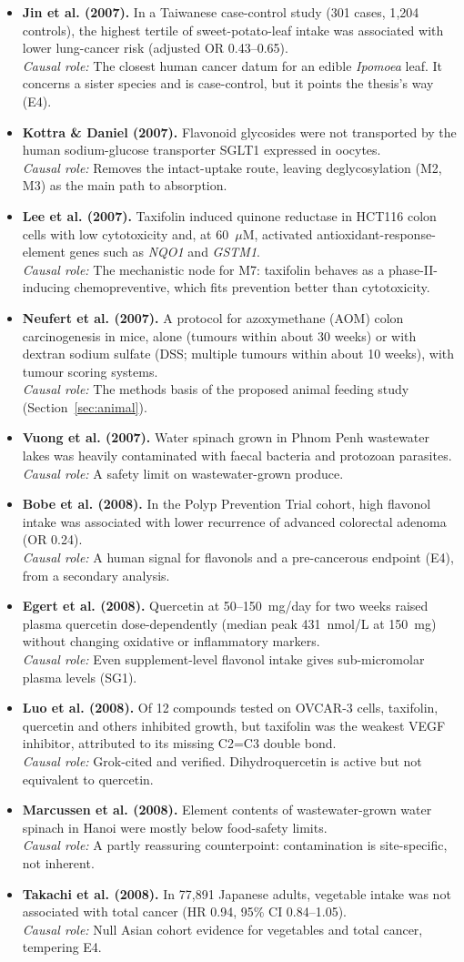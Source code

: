 \documentclass[11pt,a4paper]{article}
\newenvironment{litlist}{\begin{itemize}[leftmargin=2.6em,labelwidth=2.2em,labelsep=0.4em,align=left,itemsep=5pt,topsep=4pt]}{\end{itemize}}
\newcommand{\litentry}[4]{\item[\cite{#1}] \textbf{\color{navy}#2.} #3\\[1pt]
  {\color{teal}\textit{Causal role:}} #4}
\begin{document}
\begin{litlist}
\litentry{jin2007}{Jin et al. (2007)}{In a Taiwanese case-control study (301 cases, 1{,}204 controls), the highest tertile of sweet-potato-leaf intake was associated with lower lung-cancer risk (adjusted OR 0.43--0.65).}{The closest human cancer datum for an edible \emph{Ipomoea} leaf. It concerns a sister species and is case-control, but it points the thesis's way (E4).}

\litentry{kottra2007}{Kottra \& Daniel (2007)}{Flavonoid glycosides were not transported by the human sodium-glucose transporter SGLT1 expressed in oocytes.}{Removes the intact-uptake route, leaving deglycosylation (M2, M3) as the main path to absorption.}

\litentry{lee2007}{Lee et al. (2007)}{Taxifolin induced quinone reductase in HCT116 colon cells with low cytotoxicity and, at 60~$\mu$M, activated antioxidant-response-element genes such as \emph{NQO1} and \emph{GSTM1}.}{The mechanistic node for M7: taxifolin behaves as a phase-II-inducing chemopreventive, which fits prevention better than cytotoxicity.}

\litentry{neufert2007}{Neufert et al. (2007)}{A protocol for azoxymethane (AOM) colon carcinogenesis in mice, alone (tumours within about 30 weeks) or with dextran sodium sulfate (DSS; multiple tumours within about 10 weeks), with tumour scoring systems.}{The methods basis of the proposed animal feeding study (Section~\ref{sec:animal}).}

\litentry{vuong2007}{Vuong et al. (2007)}{Water spinach grown in Phnom Penh wastewater lakes was heavily contaminated with faecal bacteria and protozoan parasites.}{A safety limit on wastewater-grown produce.}

\litentry{bobe2008}{Bobe et al. (2008)}{In the Polyp Prevention Trial cohort, high flavonol intake was associated with lower recurrence of advanced colorectal adenoma (OR 0.24).}{A human signal for flavonols and a pre-cancerous endpoint (E4), from a secondary analysis.}

\litentry{egert2008}{Egert et al. (2008)}{Quercetin at 50--150~mg/day for two weeks raised plasma quercetin dose-dependently (median peak 431~nmol/L at 150~mg) without changing oxidative or inflammatory markers.}{Even supplement-level flavonol intake gives sub-micromolar plasma levels (SG1).}

\litentry{luo2008}{Luo et al. (2008)}{Of 12 compounds tested on OVCAR-3 cells, taxifolin, quercetin and others inhibited growth, but taxifolin was the weakest VEGF inhibitor, attributed to its missing C2=C3 double bond.}{Grok-cited and verified. Dihydroquercetin is active but not equivalent to quercetin.}

\litentry{marcussen2008}{Marcussen et al. (2008)}{Element contents of wastewater-grown water spinach in Hanoi were mostly below food-safety limits.}{A partly reassuring counterpoint: contamination is site-specific, not inherent.}

\litentry{takachi2008}{Takachi et al. (2008)}{In 77{,}891 Japanese adults, vegetable intake was not associated with total cancer (HR 0.94, 95\% CI 0.84--1.05).}{Null Asian cohort evidence for vegetables and total cancer, tempering E4.}
\end{litlist}
\end{document}
